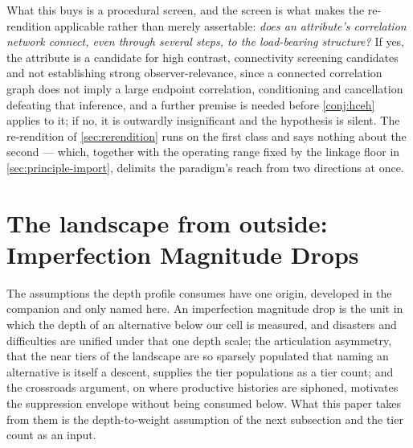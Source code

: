 \documentclass[11pt]{article}
\theoremstyle{definition}
\begin{document}
What this buys is a procedural screen, and the screen is what makes the re-rendition applicable rather than merely assertable: \emph{does an attribute's correlation network connect, even through several steps, to the load-bearing structure?} If yes, the attribute is a candidate for high contrast, connectivity screening candidates and not establishing strong observer-relevance, since a connected correlation graph does not imply a large endpoint correlation, conditioning and cancellation defeating that inference, and a further premise is needed before \autoref{conj:hceh} applies to it; if no, it is outwardly insignificant and the hypothesis is silent. The re-rendition of \autoref{sec:rerendition} runs on the first class and says nothing about the second --- which, together with the operating range fixed by the linkage floor in \autoref{sec:principle-import}, delimits the paradigm's reach from two directions at once.


\section{The landscape from outside: Imperfection Magnitude Drops}
\label{sec:landscape}

\label{sec:landscape-imd}\label{sec:landscape-nameability}
The assumptions the depth profile consumes have one origin, developed in the companion \cite{Nexus} and only named here. An imperfection magnitude drop is the unit in which the depth of an alternative below our cell is measured, and disasters and difficulties are unified under that one depth scale; the articulation asymmetry, that the near tiers of the landscape are so sparsely populated that naming an alternative is itself a descent, supplies the tier populations as a tier count; and the crossroads argument, on where productive histories are siphoned, motivates the suppression envelope without being consumed below. What this paper takes from them is the depth-to-weight assumption of the next subsection and the tier count as an input.
\end{document}
